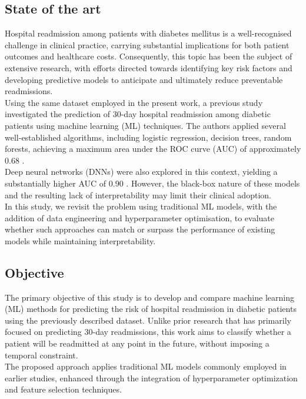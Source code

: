 \subsection{State of the art}
Hospital readmission among patients with diabetes mellitus is a well-recognised challenge in clinical practice, carrying substantial implications for both patient outcomes and healthcare costs. Consequently, this topic has been the subject of extensive research, with efforts directed towards identifying key risk factors and developing predictive models to anticipate and ultimately reduce preventable readmissions.\\
Using the same dataset employed in the present work, a previous study investigated the prediction of 30-day hospital readmission among diabetic patients using machine learning (ML) techniques. The authors applied several well-established algorithms, including logistic regression, decision trees, random forests, achieving a maximum area under the ROC curve (AUC) of approximately 0.68 \cite{shang202130}.\\
Deep neural networks (DNNs) were also explored in this context, yielding a substantially higher AUC of 0.90 \cite{hammoudeh2018predicting}. However, the black-box nature of these models and the resulting lack of interpretability may limit their clinical adoption.\\
In this study, we revisit the problem using traditional ML models, with the addition of data engineering and hyperparameter optimisation, to evaluate whether such approaches can match or surpass the performance of existing models while maintaining interpretability.


\subsection{Objective}
The primary objective of this study is to develop and compare machine learning (ML) methods for predicting the risk of hospital readmission in diabetic patients using the previously described dataset. Unlike prior research that has primarily focused on predicting 30-day readmissions, this work aims to classify whether a patient will be readmitted at any point in the future, without imposing a temporal constraint.\\
The proposed approach applies traditional ML models commonly employed in earlier studies, enhanced through the integration of hyperparameter optimization and feature selection techniques.



